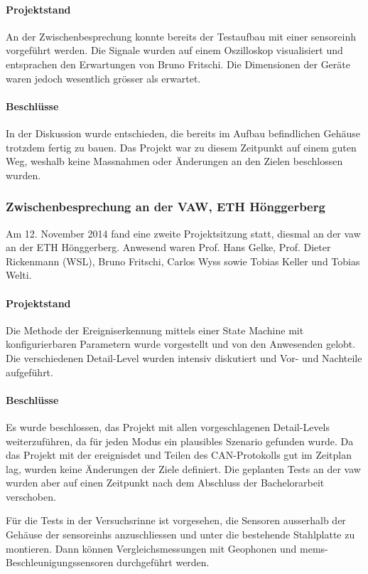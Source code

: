 \paragraph{Projektstand} An der Zwischenbesprechung konnte bereits der Testaufbau mit einer \gls{sensoreinh} vorgeführt werden. Die Signale wurden auf einem Oszilloskop visualisiert und entsprachen den Erwartungen von Bruno Fritschi. Die Dimensionen der Geräte waren jedoch wesentlich grösser als erwartet. 

\paragraph{Beschlüsse} In der Diskussion wurde entschieden, die bereits im Aufbau befindlichen Gehäuse trotzdem fertig zu bauen. Das Projekt war zu diesem Zeitpunkt auf einem guten Weg, weshalb keine Massnahmen oder Änderungen an den Zielen beschlossen wurden.

\subsubsection{Zwischenbesprechung an der VAW, ETH Hönggerberg}
Am 12. November 2014 fand eine zweite Projektsitzung statt, diesmal an der \gls{vaw} an der ETH Hönggerberg. Anwesend waren Prof. Hans Gelke, Prof. Dieter Rickenmann (WSL), Bruno Fritschi, Carlos Wyss sowie Tobias Keller und Tobias Welti.

\paragraph{Projektstand} Die Methode der Ereigniserkennung mittels einer State Machine mit konfigurierbaren Parametern wurde vorgestellt und von den Anwesenden gelobt. Die verschiedenen Detail-Level wurden intensiv diskutiert und Vor- und Nachteile aufgeführt. 

\paragraph{Beschlüsse} Es wurde beschlossen, das Projekt mit allen vorgeschlagenen Detail-Levels weiterzuführen, da für jeden Modus ein plausibles Szenario gefunden wurde. Da das Projekt mit der \gls{ereignisdet} und Teilen des CAN-Protokolls gut im Zeitplan lag, wurden keine Änderungen der Ziele definiert. Die geplanten Tests an der \gls{vaw} wurden aber auf einen Zeitpunkt nach dem Abschluss der Bachelorarbeit verschoben.

Für die Tests in der Versuchsrinne ist vorgesehen, die Sensoren ausserhalb der Gehäuse der \glspl{sensoreinh} anzuschliessen und unter die bestehende Stahlplatte zu montieren. Dann können Vergleichsmessungen mit Geophonen und \gls{mems}-Beschleunigungssensoren durchgeführt werden.

